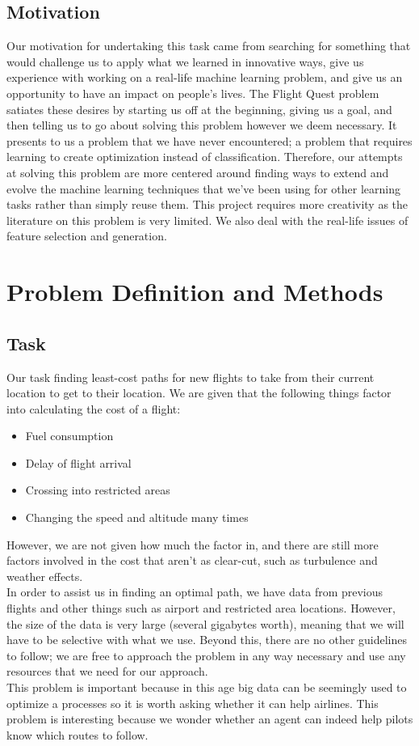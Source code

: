 \documentclass{article}[12pt]
\begin{document}
\begin{multicols}{2}
\subsection{Motivation}
Our motivation for undertaking this task came from searching for something that would challenge us to apply what we learned in innovative ways, give us experience with working on a real-life machine learning problem, and give us an opportunity to have an impact on people's lives. The Flight Quest problem satiates these desires by starting us off at the beginning, giving us a goal, and then telling us to go about solving this problem however we deem necessary. It presents to us a problem that we have never encountered; a problem that requires learning to create optimization instead of classification. Therefore, our attempts at solving this problem are more centered around finding ways to extend and evolve the machine learning techniques that we've been using for other learning tasks rather than simply reuse them. This project requires more creativity as the literature on this problem is very limited. We also deal with the real-life issues of feature selection and generation. 
 
\section{Problem Definition and Methods}

\subsection{Task}
Our task finding least-cost paths for new flights to take from their current location to get to their location. We are given that the following things factor into calculating the cost of a flight:
	\begin{itemize}
		\item Fuel consumption
		\item Delay of flight arrival
		\item Crossing into restricted areas
		\item Changing the speed and altitude many times
	\end{itemize}
However, we are not given how much the factor in, and there are still more factors involved in the cost that aren't as clear-cut, such as turbulence and weather effects.\\

In order to assist us in finding an optimal path, we have data from previous flights and other things such as airport and restricted area locations. However, the size of the data is very large (several gigabytes worth), meaning that we will have to be selective with what we use. Beyond this, there are no other guidelines to follow; we are free to approach the problem in any way necessary and use any resources that we need for our approach.\\
This problem is important because in this age big data can be seemingly used to optimize a processes so it is worth asking whether it can help airlines. This problem is interesting because we wonder whether an agent can indeed help pilots know which routes to follow.


\end{multicols}
\end{document}
